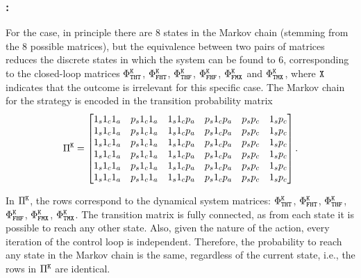 \subsubsection*{\tK{}:}
For the \tK{} case, in principle there are $8$ states in the Markov chain (stemming from the $8$ possible matrices), but the equivalence between two pairs of matrices reduces the discrete states in which the system can be found to $6$, corresponding to the closed-loop matrices $\Phi^{\texttt{K}}_{\texttt{T}\texttt{H}\texttt{T}}$, $\Phi^{\texttt{K}}_{\texttt{F}\texttt{H}\texttt{T}}$, $\Phi^{\texttt{K}}_{\texttt{T}\texttt{H}\texttt{F}}$, $\Phi^{\texttt{K}}_{\texttt{F}\texttt{H}\texttt{F}}$, $\Phi^{\texttt{K}}_{\texttt{F}\texttt{M}\texttt{X}}$ and $\Phi^{\texttt{K}}_{\texttt{T}\texttt{M}\texttt{X}}$, where $\texttt{X}$ indicates that the outcome is irrelevant for this specific case.
The Markov chain for the \tK{} strategy is encoded in the transition probability matrix
{\small
\begin{equation}
\label{eq:pikill}
\Pi^{\Kill} = \begin{bmatrix}
        1_s1_c1_a & p_s1_c1_a & 1_s1_cp_a & p_s1_cp_a & p_sp_c & 1_sp_c \\
        1_s1_c1_a & p_s1_c1_a & 1_s1_cp_a & p_s1_cp_a & p_sp_c & 1_sp_c \\
        1_s1_c1_a & p_s1_c1_a & 1_s1_cp_a & p_s1_cp_a & p_sp_c & 1_sp_c \\
        1_s1_c1_a & p_s1_c1_a & 1_s1_cp_a & p_s1_cp_a & p_sp_c & 1_sp_c \\
        1_s1_c1_a & p_s1_c1_a & 1_s1_cp_a & p_s1_cp_a & p_sp_c & 1_sp_c \\
        1_s1_c1_a & p_s1_c1_a & 1_s1_cp_a & p_s1_cp_a & p_sp_c & 1_sp_c \\
\end{bmatrix}.
\end{equation}
}

In $\Pi^{\texttt{K}}$, the rows correspond to the dynamical system matrices: $\Phi^{\texttt{K}}_{\texttt{T}\texttt{H}\texttt{T}}$, $\Phi^{\texttt{K}}_{\texttt{F}\texttt{H}\texttt{T}}$, $\Phi^{\texttt{K}}_{\texttt{T}\texttt{H}\texttt{F}}$, $\Phi^{\texttt{K}}_{\texttt{F}\texttt{H}\texttt{F}}$, $\Phi^{\texttt{K}}_{\texttt{F}\texttt{M}\texttt{X}}$, $\Phi^{\texttt{K}}_{\texttt{T}\texttt{M}\texttt{X}}$.
The transition matrix is fully connected, as from each state it is possible to reach any other state.
Also, given the nature of the \tK{} action, every iteration of the control loop is independent.
Therefore, the probability to reach any state in the Markov chain is the same, regardless of the current state, i.e., the rows in $\Pi^{\texttt{K}}$ are identical.

